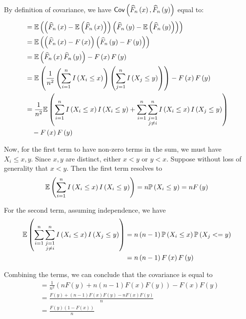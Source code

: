 \documentclass[a4paper]{article}
\begin{document}
By definition of covariance, we have \(\operatorname{\textsf{Cov}}\left( \widehat{F}_{n} \left( x \right) , \widehat{F}_{n} \left( y \right)  \right)\) equal to:
\begin{align*}
	 & = \mathbb{E}\left( \left( \widehat{F}_{n}\left( x \right) - \mathbb{E}\left( \widehat{F}_{n}\left( x \right)  \right) \right) \left( \widehat{F}_{n}\left( y \right) - \mathbb{E}\left( \widehat{F}_{n}\left( y \right)  \right) \right)  \right) \\
	 & = \mathbb{E}\left( \left( \widehat{F}_{n}\left( x \right) - F \left( x \right)  \right) \left( \widehat{F}_{n}\left( y \right) - F \left( y \right)  \right)  \right)  \\ 
	 & = \mathbb{E}\left( \widehat{F}_{n}\left( x \right) \widehat{F}_{n}\left( y \right)  \right) - F \left( x \right) F \left( y \right) \\
	 & = \mathbb{E}\left( \frac{1}{n^{2}} \left( \sum_{i=1}^{n} I \left( X_{i} \le x \right)  \right) \left( \sum_{j=1}^{n} I \left( X_{j} \le y \right)  \right)  \right) - F \left( x \right) F \left( y \right) \\
	 & = \frac{1}{n^{2}} \mathbb{E}\left( \sum_{i=1}^{n} I \left( X_{i} \le x \right) I \left( X_{i} \le y \right) + \sum_{i=1}^{n} \sum_{\substack{j = 1 \\ j \neq i}}^{n} I \left( X_{i} \le x \right) I \left( X_{j} \le y \right)  \right) \\
	 & \quad - F \left( x \right) F \left( y \right) 
\end{align*}

Now, for the first term to have non-zero terms in the sum, we must have \(X_{i} \le x,y\). Since \(x,y\) are distinct, either \(x < y\) or \(y < x\). Suppose without loss of generality that \(x < y\). Then the first term resolves to
\[
	\mathbb{E}\left( \sum_{i=1}^{n} I \left( X_{i} \le x \right) I \left( X_{i} \le y \right)  \right) = n \mathbb{P}\left( X_{i} \le y \right) = n F \left( y \right) 
\]

For the second term, assuming independence, we have
\begin{align*}
	\mathbb{E}\left( \sum_{i=1}^{n} \sum_{\substack{j = 1 \\ j \neq i}}^{n} I \left( X_{i} \le x \right) I \left( X_{j} \le y \right)  \right) & = n \left( n-1 \right) \mathbb{P}\left( X_{i} \le x \right) \mathbb{P}\left( X_{j}<= y \right) \\
	 & = n \left( n-1 \right) F \left( x \right) F \left( y \right)  \\ 
\end{align*}

Combining the terms, we can conclude that the covariance is equal to
\begin{align*}
	 & = \frac{1}{n^{2}} \left( n F \left( y \right) + n \left( n - 1 \right) F \left( x \right) F \left( y \right)  \right) - F \left( x \right) F \left( y \right)  \\
	 & = \frac{F \left( y \right) + \left( n - 1 \right) F \left( x \right) F \left( y \right) - n F \left( x \right) F \left( y \right) }{n} \\ 
	 & = \boxed{\frac{F \left( y \right) \left( 1 - F \left( x \right)  \right) }{n}}
\end{align*}
\end{document}
